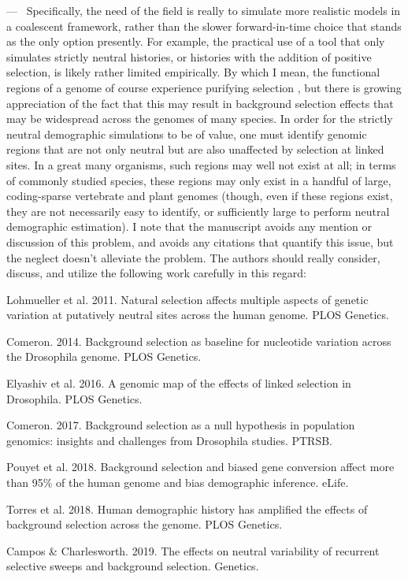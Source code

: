 \documentclass[11pt]{article}
\newcounter{reviewer}
\newcounter{point}[reviewer]
\renewcommand{\thepoint}{\thereviewer.\arabic{point}}
\newenvironment{point}
   {\refstepcounter{point} \bigskip \noindent {\textbf{Reviewer~Point~\thepoint} } ---\ }
   {\par }
\begin{document}
\begin{point}
Specifically, the need of the field is really to simulate more realistic models
in a coalescent framework, rather than the slower forward-in-time choice that
stands as the only option presently. For example, the practical use of a tool
that only simulates strictly neutral histories, or histories with the addition
of positive selection, is likely rather limited empirically. By which I mean,
the functional regions of a genome of course experience purifying selection ,
but there is growing appreciation of the fact that this may result in
background selection effects that may be widespread across the genomes of many
species. In order for the strictly neutral demographic simulations to be of
value, one must identify genomic regions that are not only neutral but are also
unaffected by selection at linked sites. In a great many organisms, such
regions may well not exist at all; in terms of commonly studied species, these
regions may only exist in a handful of large, coding-sparse vertebrate and
plant genomes (though, even if these regions exist, they are not necessarily
easy to identify, or sufficiently large to perform neutral demographic
estimation). I note that the manuscript avoids any mention or discussion of
this problem, and avoids any citations that quantify this issue, but the
neglect doesn't alleviate the problem. The authors should really consider,
discuss, and utilize the following work carefully in this regard:

Lohmueller et al. 2011. Natural selection affects multiple aspects of genetic
variation at putatively neutral sites across the human genome. PLOS Genetics.

Comeron. 2014. Background selection as baseline for nucleotide variation across
the Drosophila genome. PLOS Genetics.

Elyashiv et al. 2016. A genomic map of the effects of linked selection in
Drosophila. PLOS Genetics.

Comeron. 2017. Background selection as a null hypothesis in population
genomics: insights and challenges from Drosophila studies. PTRSB.

Pouyet et al. 2018. Background selection and biased gene conversion affect more
than 95\% of the human genome and bias demographic inference. eLife.

Torres et al. 2018. Human demographic history has amplified the effects of
background selection across the genome. PLOS Genetics.

Campos \& Charlesworth. 2019. The effects on neutral variability of recurrent
selective sweeps and background selection. Genetics.


\end{point}
\end{document}
